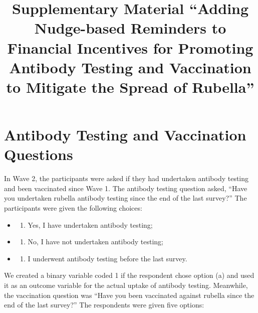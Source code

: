 \documentclass[
]{article}
\title{Supplementary Material
``Adding Nudge-based Reminders to Financial Incentives for Promoting Antibody Testing and Vaccination to Mitigate the Spread of Rubella''}
\author{}
\date{\vspace{-2.5em}}
\providecommand{\tightlist}{%
  \setlength{\itemsep}{0pt}\setlength{\parskip}{0pt}}
\begin{document}
\maketitle

{
\setcounter{tocdepth}{2}
\tableofcontents
}
\hypertarget{appendix-appendix}{%
\appendix}


\hypertarget{question}{%
\section{Antibody Testing and Vaccination Questions}\label{question}}

In Wave 2, the participants were asked if they had undertaken antibody testing and been vaccinated since Wave 1. The antibody testing question asked, ``Have you undertaken rubella antibody testing since the end of the last survey?'' The participants were given the following choices:

\begin{itemize}
\item
  \begin{enumerate}
  \def\labelenumi{(\alph{enumi})}
  \tightlist
  \item
    Yes, I have undertaken antibody testing;
  \end{enumerate}
\item
  \begin{enumerate}
  \def\labelenumi{(\alph{enumi})}
  \setcounter{enumi}{1}
  \tightlist
  \item
    No, I have not undertaken antibody testing;
  \end{enumerate}
\item
  \begin{enumerate}
  \def\labelenumi{(\alph{enumi})}
  \setcounter{enumi}{2}
  \tightlist
  \item
    I underwent antibody testing before the last survey.
  \end{enumerate}
\end{itemize}

We created a binary variable coded 1 if the respondent chose option (a) and used it as an outcome variable for the actual uptake of antibody testing. Meanwhile, the vaccination question was ``Have you been vaccinated against rubella since the end of the last survey?'' The respondents were given five options:
\end{document}

